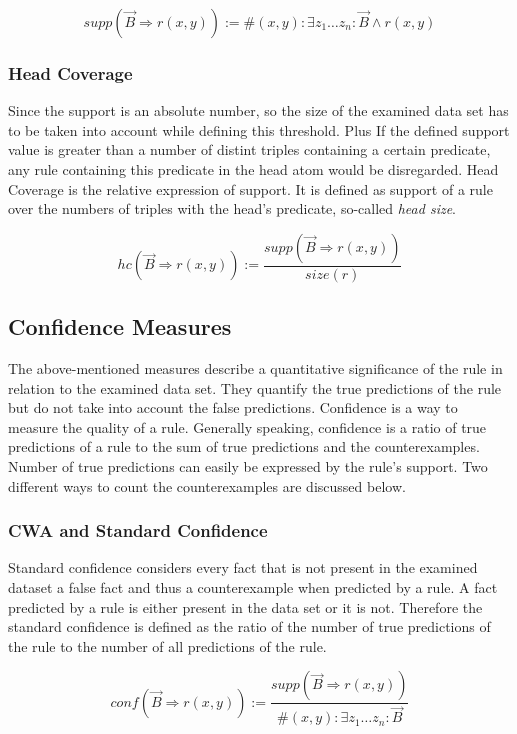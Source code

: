 $$ supp(\vec{B} \Rightarrow r(x,y)) := \# (x,y): \exists z_{1}\ldots z_{n}: \vec{B} \land r(x,y) $$

\subsubsection{Head Coverage}

Since the support is an absolute number, so the size of the examined data set has to be taken into account while defining this threshold. Plus If the defined support value is greater than a number of distint triples containing a certain predicate, any rule containing this predicate in the head atom would be disregarded. Head Coverage is the relative expression of support. It is defined as support of a rule over the numbers of triples with the head's predicate, so-called \textit{head size}.

$$ hc(\vec{B} \Rightarrow r(x,y)) := \frac{supp(\vec{B} \Rightarrow r(x,y))}{size(r)}  $$

\subsection{Confidence Measures}

The above-mentioned measures describe a quantitative significance of the rule in relation to the examined data set. They quantify the true predictions of the rule but do not take into account the false predictions. Confidence is a way to measure the quality of a rule. Generally speaking, confidence is a ratio of true predictions of a rule to the sum of true predictions and the counterexamples. Number of true predictions can easily be expressed by the rule's support. Two different ways to count the counterexamples are discussed below.

\subsubsection{CWA and Standard Confidence}

Standard confidence considers every fact that is not present in the examined dataset a false fact and thus a counterexample when predicted by a rule. A fact predicted by a rule is either present in the data set or it is not. Therefore the standard confidence is defined as the ratio of the number of true predictions of the rule to the number of all predictions of the rule.

$$ conf(\vec{B} \Rightarrow r(x,y)) := \frac{supp(\vec{B} \Rightarrow r(x,y))}{\# (x,y): \exists z_{1}\ldots z_{n}: \vec{B}} $$

